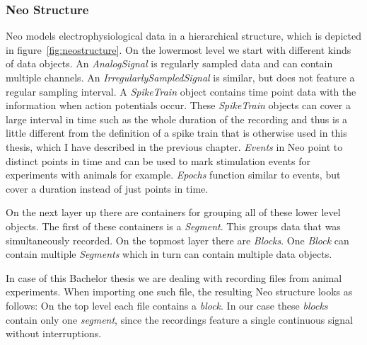 \subsubsection{Neo Structure}
Neo models electrophysiological data in a hierarchical structure, which is depicted in figure~\ref{fig:neostructure}. On the lowermost level we start with different kinds of data objects. An \textit{AnalogSignal} is regularly sampled data and can contain multiple channels. An \textit{IrregularlySampledSignal} is similar, but does not feature a regular sampling interval. A \textit{SpikeTrain} object contains time point data with the information when action potentials occur. These \textit{SpikeTrain} objects can cover a large interval in time such as the whole duration of the recording and thus is a little different from the definition of a spike train that is otherwise used in this thesis, which I have described in the previous chapter. 
\textit{Events} in Neo point to distinct points in time and can be used to mark stimulation events for experiments with animals for example. \textit{Epochs} function similar to events, but cover a duration instead of just points in time.

On the next layer up there are containers for grouping all of these lower level objects. The first of these containers is a \textit{Segment}. This groups data that was simultaneously recorded. On the topmost layer there are \textit{Blocks}. One \textit{Block} can contain multiple \textit{Segments} which in turn can contain multiple data objects.

In case of this Bachelor thesis we are dealing with recording files from animal experiments. When importing one such file, the resulting Neo structure looks as follows: On the top level each file contains a \textit{block}. In our case these \textit{blocks} contain only one \textit{segment}, since the recordings feature a single continuous signal without interruptions.


